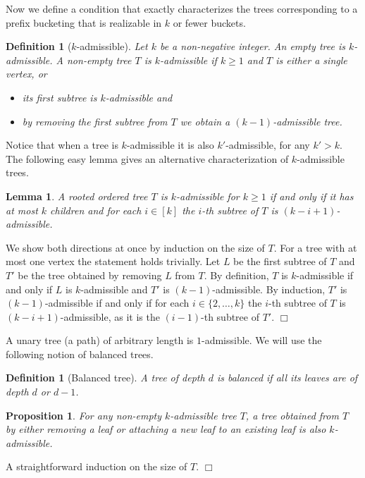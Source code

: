 \documentclass[11pt]{article}
\newtheorem{lemma}[theorem]{Lemma}
\newtheorem{definition}[theorem]{Definition}
\newtheorem{proposition}[theorem]{Proposition}
\newcommand{\qed}{$\Box$}
\newenvironment{proof}{\noindent {\bf Proof:}}{\hfill \qed \smallskip}
\begin{document}
Now we define a condition that exactly characterizes the trees corresponding to a prefix bucketing that is realizable in $k$ or fewer buckets.
\begin{definition}[$k$-admissible]
\label{def:k-admissibility}
Let $k$ be a non-negative integer. An empty tree is \emph{$k$-admissible}. A non-empty tree $T$ is \emph{$k$-admissible} if $k \ge 1$ and $T$ is either a single vertex, or
\begin{itemize}
\item its first subtree is $k$-admissible and
\item by removing the first subtree from $T$ we obtain a $(k - 1)$-admissible tree.
\end{itemize}
\end{definition}
Notice that when a tree is $k$-admissible it is also $k'$-admissible, for any $k'>k$.
The following easy lemma gives an alternative characterization of $k$-admissible trees.
\begin{lemma}
\label{lm:k-admissibility}
A rooted ordered tree $T$ is $k$-admissible for $k \ge 1$ if and only if it has at most $k$ children
and for each $i \in [k]$ the $i$-th subtree of $T$ is $(k - i + 1)$-admissible.
\end{lemma}
\begin{proof} %
We show both directions at once by induction on the size of $T$.
For a tree with at most one vertex the statement holds trivially.
Let $L$ be the first subtree of $T$ and $T'$ be the tree obtained by removing $L$ from $T$.
By definition, $T$ is $k$-admissible if and only if $L$ is $k$-admissible and $T'$ is $(k-1)$-admissible.
By induction, $T'$ is $(k-1)$-admissible if and only if for each $i \in \{2,\dotsc,k\}$
the $i$-th subtree of $T$ is $(k-i+1)$-admissible, as it is the $(i-1)$-th subtree of $T'$.
\end{proof}


A unary tree (a path) of arbitrary length is $1$-admissible. We will use the following notion of balanced trees.

\begin{definition}[Balanced tree]
A tree of depth $d$ is balanced if all its leaves are of depth $d$ or $d - 1$.
\end{definition}

\begin{proposition}
For any non-empty $k$-admissible tree $T$, a tree obtained from $T$ by either removing a leaf or
attaching a new leaf to an existing leaf is also $k$-admissible.
\end{proposition}
\begin{proof}
A straightforward induction on the size of $T$.
\end{proof}
\end{document}
